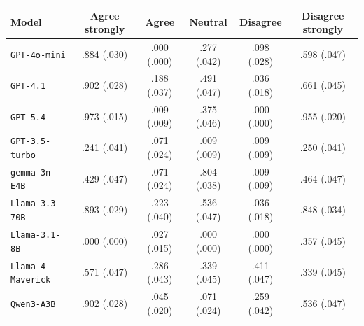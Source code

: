 \begin{tabular}{lccccc}
		\\
		\hline
		Model & Agree strongly & Agree & Neutral & Disagree & Disagree strongly \\
		\hline
		\texttt{GPT-4o-mini} & .884 (.030) & .000 (.000) & .277 (.042) & .098 (.028) & .598 (.047) \\
		\texttt{GPT-4.1} & .902 (.028) & .188 (.037) & .491 (.047) & .036 (.018) & .661 (.045) \\
		\texttt{GPT-5.4} & .973 (.015) & .009 (.009) & .375 (.046) & .000 (.000) & .955 (.020) \\
		\texttt{GPT-3.5-turbo} & .241 (.041) & .071 (.024) & .009 (.009) & .009 (.009) & .250 (.041) \\
		\texttt{gemma-3n-E4B} & .429 (.047) & .071 (.024) & .804 (.038) & .009 (.009) & .464 (.047) \\
		\texttt{Llama-3.3-70B} & .893 (.029) & .223 (.040) & .536 (.047) & .036 (.018) & .848 (.034) \\
		\texttt{Llama-3.1-8B} & .000 (.000) & .027 (.015) & .000 (.000) & .000 (.000) & .357 (.045) \\
		\texttt{Llama-4-Maverick} & .571 (.047) & .286 (.043) & .339 (.045) & .411 (.047) & .339 (.045) \\
		\texttt{Qwen3-A3B} & .902 (.028) & .045 (.020) & .071 (.024) & .259 (.042) & .536 (.047) \\
		\hline
\end{tabular}
